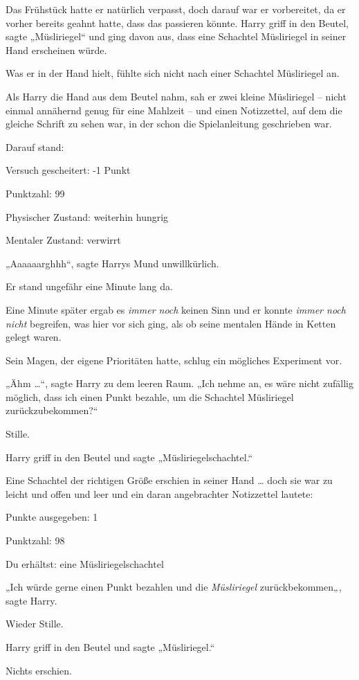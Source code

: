 {Das Frühstück hatte er natürlich verpasst, doch darauf war er vorbereitet, da er vorher bereits geahnt hatte, dass das passieren könnte. Harry griff in den Beutel, sagte „Müsliriegel“ und ging davon aus, dass eine Schachtel Müsliriegel in seiner Hand erscheinen würde.

Was er in der Hand hielt, fühlte sich nicht nach einer Schachtel Müsliriegel an.

Als Harry die Hand aus dem Beutel nahm, sah er zwei kleine Müsliriegel -- nicht einmal annähernd genug für eine Mahlzeit -- und einen Notizzettel, auf dem die gleiche Schrift zu sehen war, in der schon die Spielanleitung geschrieben war.

Darauf stand:

Versuch gescheitert: -1 Punkt

Punktzahl: 99

Physischer Zustand: weiterhin hungrig

Mentaler Zustand: verwirrt

„Aaaaaarghhh“, sagte Harrys Mund unwillkürlich.

Er stand ungefähr eine Minute lang da.

Eine Minute später ergab es \emph{immer noch} keinen Sinn und er konnte \emph{immer noch nicht} begreifen, was hier vor sich ging, als ob seine mentalen Hände in Ketten gelegt waren.

Sein Magen, der eigene Prioritäten hatte, schlug ein mögliches Experiment vor.

„Ähm …“, sagte Harry zu dem leeren Raum. „Ich nehme an, es wäre nicht zufällig möglich, dass ich einen Punkt bezahle, um die Schachtel Müsliriegel zurückzubekommen?“

Stille.

Harry griff in den Beutel und sagte „Müsliriegelschachtel.“

Eine Schachtel der richtigen Größe erschien in seiner Hand … doch sie war zu leicht und offen und leer und ein daran angebrachter Notizzettel lautete:

Punkte ausgegeben: 1

Punktzahl: 98

Du erhältst: eine Müsliriegelschachtel

„Ich würde gerne einen Punkt bezahlen und die \emph{Müsliriegel} zurückbekommen„, sagte Harry.

Wieder Stille.

Harry griff in den Beutel und sagte „Müsliriegel.“

Nichts erschien.

}
